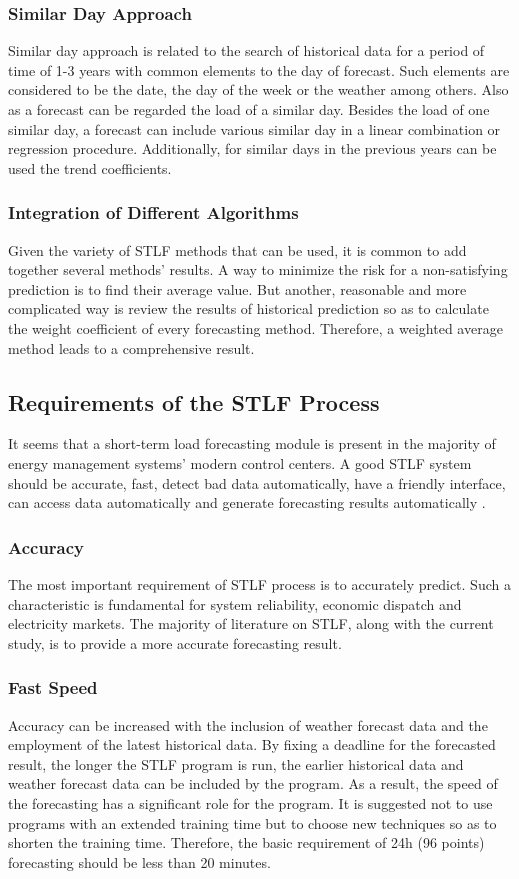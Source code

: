 \subsubsection{Similar Day Approach}
Similar day approach is related to the search of historical data for a period of time of 1-3 years with common elements to the day of forecast. Such elements are considered to be the date, the day of the week or the weather among others. Also as a forecast can be regarded the load of a similar day. Besides the load of one similar day, a forecast can include various similar day in a linear combination or regression procedure. Additionally, for similar days in the previous years can be used the trend coefficients.

\subsubsection{Integration of Different Algorithms}
Given the variety of STLF methods that can be used, it is common to add together several methods’ results. A way to minimize the risk for a non-satisfying prediction is to find their average value. But another, reasonable and more complicated way is review the results of historical prediction so as to calculate the weight coefficient of every forecasting method. Therefore, a weighted average method leads to a comprehensive result.

\subsection{Requirements of the STLF Process}
It seems that a short-term load forecasting module is present in the majority of energy management systems’ modern control centers. A good STLF system should be accurate, fast, detect bad data automatically, have a friendly interface, can access data automatically and generate forecasting results automatically \cite{feinberg2005load}.

\subsubsection{Accuracy}
The most important requirement of STLF process is to accurately predict. Such a characteristic is fundamental for system reliability, economic dispatch and electricity markets. The majority of literature on STLF, along with the current study, is to provide a more accurate forecasting result.

\subsubsection{Fast Speed}
Accuracy can be increased with the inclusion of weather forecast data and the employment of the latest historical data. By fixing a deadline for the forecasted result, the longer the STLF program is run, the earlier historical data and weather forecast data can be included by the program. As a result, the speed of the forecasting has a significant role for the program.
It is suggested not to use programs with an extended training time but to choose new techniques so as to shorten the training time. Therefore, the basic requirement of 24h (96 points) forecasting should be less than 20 minutes.

